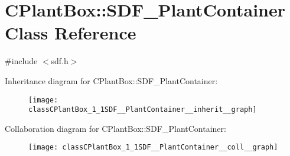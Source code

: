 \hypertarget{classCPlantBox_1_1SDF__PlantContainer}{}\section{C\+Plant\+Box\+:\+:S\+D\+F\+\_\+\+Plant\+Container Class Reference}
\label{classCPlantBox_1_1SDF__PlantContainer}


{\ttfamily \#include $<$sdf.\+h$>$}



Inheritance diagram for C\+Plant\+Box\+:\+:S\+D\+F\+\_\+\+Plant\+Container\+:\nopagebreak
\begin{figure}[H]
\begin{center}
\leavevmode
\texttt{[image: classCPlantBox\_1\_1SDF\_\_PlantContainer\_\_inherit\_\_graph]}
\end{center}
\end{figure}


Collaboration diagram for C\+Plant\+Box\+:\+:S\+D\+F\+\_\+\+Plant\+Container\+:\nopagebreak
\begin{figure}[H]
\begin{center}
\leavevmode
\texttt{[image: classCPlantBox\_1\_1SDF\_\_PlantContainer\_\_coll\_\_graph]}
\end{center}
\end{figure}
